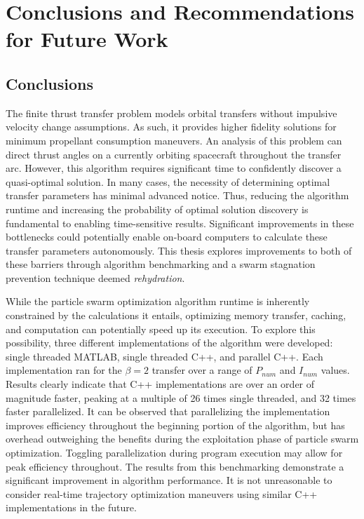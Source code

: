\chapter{Conclusions and Recommendations for Future Work}

\section{Conclusions}
\noindent The finite thrust transfer problem models orbital transfers without
impulsive velocity change assumptions. As such, it provides higher fidelity
solutions for minimum propellant consumption maneuvers. An analysis of this problem
can direct thrust angles on a currently orbiting spacecraft throughout the transfer arc.
However, this algorithm requires significant time to confidently discover a quasi-optimal 
solution. In many cases, the necessity of determining optimal transfer parameters has minimal
advanced notice.
Thus, reducing the algorithm runtime and increasing the probability of optimal 
solution discovery is fundamental to enabling time-sensitive results. Significant improvements
in these bottlenecks could potentially enable on-board computers to calculate these transfer 
parameters autonomously. This thesis explores improvements to both of these barriers through algorithm 
benchmarking and a swarm stagnation prevention technique deemed \textit{rehydration}. \newline

\noindent While the particle swarm optimization algorithm runtime is inherently constrained by the 
calculations it entails, optimizing memory transfer, caching, and computation can potentially speed up its
execution. To explore this possibility, three different implementations of the algorithm were developed:
single threaded MATLAB, single threaded C++, and parallel C++. Each implementation ran for the $\beta = 2$
transfer over a range of $P_{num}$ and $I_{num}$ values. Results clearly indicate that C++ implementations 
are over an order of magnitude faster, peaking at a multiple of 26 times single threaded, and 32 times faster
parallelized. It can be observed that parallelizing the implementation improves efficiency throughout the
beginning portion of the algorithm, but has overhead outweighing the benefits during the exploitation phase of
particle swarm optimization. Toggling parallelization during program execution may allow for peak
efficiency throughout. The results from this benchmarking demonstrate a significant improvement in 
algorithm performance. It is not unreasonable to consider real-time trajectory optimization maneuvers using 
similar C++ implementations in the future. \newline

